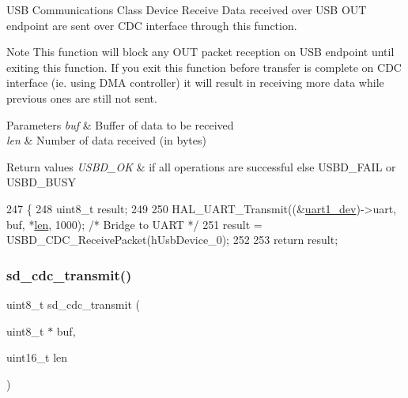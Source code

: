 U\+SB Communications Class Device Receive Data received over U\+SB O\+UT endpoint are sent over C\+DC interface through this function. 

\begin{DoxyNote}{Note}
This function will block any O\+UT packet reception on U\+SB endpoint until exiting this function. If you exit this function before transfer is complete on C\+DC interface (ie. using D\+MA controller) it will result in receiving more data while previous ones are still not sent.
\end{DoxyNote}

\begin{DoxyParams}{Parameters}
{\em buf} & Buffer of data to be received \\
\hline
{\em len} & Number of data received (in bytes) \\
\hline
\end{DoxyParams}

\begin{DoxyRetVals}{Return values}
{\em U\+S\+B\+D\+\_\+\+OK} & if all operations are successful else U\+S\+B\+D\+\_\+\+F\+A\+IL or U\+S\+B\+D\+\_\+\+B\+U\+SY \\
\hline
\end{DoxyRetVals}

\begin{DoxyCode}
247 \{
248     uint8\_t result;
249 
250     HAL\_UART\_Transmit((&\mbox{\hyperlink{group___s_d___u_a_r_t___exported___variables_ga34b6075e649bd2f9d6bcef303a9cdce6}{uart1\_dev}})->uart, buf, *\mbox{\hyperlink{structsd__cbuf_a96bbf959016e4411c9e6b9812a8be60a}{len}}, 1000); \textcolor{comment}{/* Bridge to UART */}
251     result = USBD\_CDC\_ReceivePacket(hUsbDevice\_0);
252   
253     \textcolor{keywordflow}{return} result;
\end{DoxyCode}
\mbox{\label{group___s_d___u_s_b___c_d_c___i_f___functions_gabd3573e5083061a52edc3dcd98e6f827}} 
\subsubsection{\texorpdfstring{sd\+\_\+cdc\+\_\+transmit()}{sd\_cdc\_transmit()}}
{\footnotesize\ttfamily uint8\+\_\+t sd\+\_\+cdc\+\_\+transmit (\begin{DoxyParamCaption}\item[{uint8\+\_\+t $\ast$}]{buf,  }\item[{uint16\+\_\+t}]{len }\end{DoxyParamCaption})}



